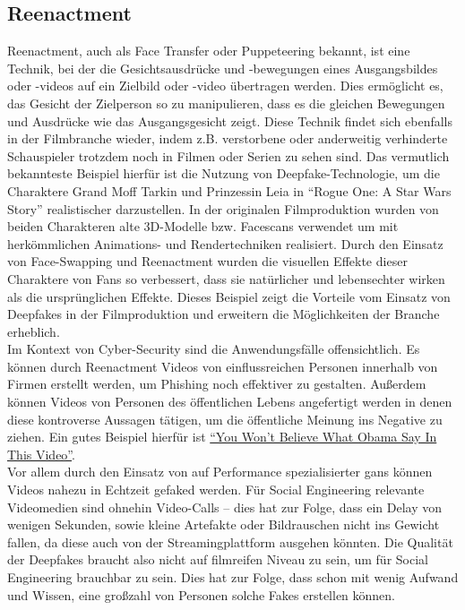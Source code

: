 \subsection{Reenactment}\label{subsec:reenactment}
Reenactment, auch als Face Transfer oder Puppeteering bekannt, ist eine Technik, bei der die Gesichtsausdrücke und -bewegungen eines Ausgangsbildes oder -videos auf ein Zielbild oder -video übertragen werden.
Dies ermöglicht es, das Gesicht der Zielperson so zu manipulieren, dass es die gleichen Bewegungen und Ausdrücke wie das Ausgangsgesicht zeigt.
Diese Technik findet sich ebenfalls in der Filmbranche wieder, indem z.B. verstorbene oder anderweitig verhinderte Schauspieler trotzdem noch in Filmen oder Serien zu sehen sind.
Das vermutlich bekannteste Beispiel hierfür ist die Nutzung von Deepfake-Technologie, um die Charaktere Grand Moff Tarkin und Prinzessin Leia in ``Rogue One: A Star Wars Story'' realistischer darzustellen.
In der originalen Filmproduktion wurden von beiden Charakteren alte 3D-Modelle bzw. Facescans verwendet um mit herkömmlichen Animations- und Rendertechniken realisiert.
Durch den Einsatz von Face-Swapping und Reenactment wurden die visuellen Effekte dieser Charaktere von Fans so verbessert, dass sie natürlicher und lebensechter wirken als die ursprünglichen Effekte.
Dieses Beispiel zeigt die Vorteile vom Einsatz von Deepfakes in der Filmproduktion und erweitern die Möglichkeiten der Branche erheblich\cite{rouge-one-deepfake}.\\
Im Kontext von Cyber-Security sind die Anwendungsfälle offensichtlich.
Es können durch Reenactment Videos von einflussreichen Personen innerhalb von Firmen erstellt werden, um Phishing noch effektiver zu gestalten.
Außerdem können Videos von Personen des öffentlichen Lebens angefertigt werden in denen diese kontroverse Aussagen tätigen, um die öffentliche Meinung ins Negative zu ziehen.
Ein gutes Beispiel hierfür ist \href{https://www.youtube.com/watch?v=cQ54GDm1eL0}{``You Won’t Believe What Obama Say In This Video''}.\\
Vor allem durch den Einsatz von auf Performance spezialisierter \glspl{gan} können Videos nahezu in Echtzeit gefaked werden.
Für Social Engineering relevante Videomedien sind ohnehin Video-Calls -- dies hat zur Folge, dass ein Delay von wenigen Sekunden, sowie kleine Artefakte oder Bildrauschen nicht ins Gewicht fallen, da diese auch von der Streamingplattform ausgehen könnten.
Die Qualität der Deepfakes braucht also nicht auf filmreifen Niveau zu sein, um für Social Engineering brauchbar zu sein.
Dies hat zur Folge, dass schon mit wenig Aufwand und Wissen, eine großzahl von Personen solche Fakes erstellen können.